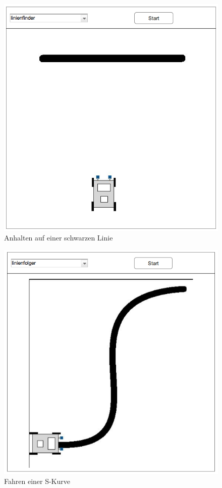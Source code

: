 \documentclass[paper=a4, pagesize, DIV=calc, BCOR=12.5mm, twoside=on, onecolumn=on, open = any, titlepage =on, parskip =half-, headsepline = on, footsepline = on, chapterprefix = on, appendixprefix = off, fontsize = 12pt, numbers = noenddot, abstract = on]{scrbook}
\numberwithin{equation}{chapter}
\theoremstyle{definition}
\theoremstyle{plain}
\theoremstyle{plain}
\theoremstyle{remark}
\theoremstyle{plain}
\theoremstyle{plain}
\begin{document}
\begin{figure}[htbp]
\centering
\includegraphics[scale=0.4]{images/mockup_linienfinder.png}
\caption{Anhalten auf einer schwarzen Linie}
\label{fig:linienfinder}
\end{figure}

\begin{figure}[htbp]
\centering
\includegraphics[scale=0.4]{images/mockup_linienfolger.png}
\caption{Fahren einer S-Kurve}
\label{fig:linienfolger}
\end{figure}
\end{document}

